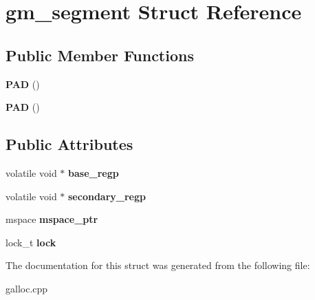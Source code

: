 \hypertarget{structgm__segment}{\section{gm\-\_\-segment Struct Reference}
\label{structgm__segment}
}
\subsection*{Public Member Functions}
\begin{DoxyCompactItemize}
\item 
\hypertarget{structgm__segment_a1ba3784ba1f090d5629cc17b2a228962}{{\bfseries P\-A\-D} ()}\label{structgm__segment_a1ba3784ba1f090d5629cc17b2a228962}

\item 
\hypertarget{structgm__segment_a1ba3784ba1f090d5629cc17b2a228962}{{\bfseries P\-A\-D} ()}\label{structgm__segment_a1ba3784ba1f090d5629cc17b2a228962}

\end{DoxyCompactItemize}
\subsection*{Public Attributes}
\begin{DoxyCompactItemize}
\item 
\hypertarget{structgm__segment_ac0372e9c8e49a31f988492e8d51827c0}{volatile void $\ast$ {\bfseries base\-\_\-regp}}\label{structgm__segment_ac0372e9c8e49a31f988492e8d51827c0}

\item 
\hypertarget{structgm__segment_ab08065e66e9472e2acf212f1546c7a84}{volatile void $\ast$ {\bfseries secondary\-\_\-regp}}\label{structgm__segment_ab08065e66e9472e2acf212f1546c7a84}

\item 
\hypertarget{structgm__segment_a1be98c862c410834087e1e3999bf5be3}{mspace {\bfseries mspace\-\_\-ptr}}\label{structgm__segment_a1be98c862c410834087e1e3999bf5be3}

\item 
\hypertarget{structgm__segment_a218ba2131e7c4eaefedb96f5c85a8574}{lock\-\_\-t {\bfseries lock}}\label{structgm__segment_a218ba2131e7c4eaefedb96f5c85a8574}

\end{DoxyCompactItemize}


The documentation for this struct was generated from the following file\-:\begin{DoxyCompactItemize}
\item 
galloc.\-cpp\end{DoxyCompactItemize}
